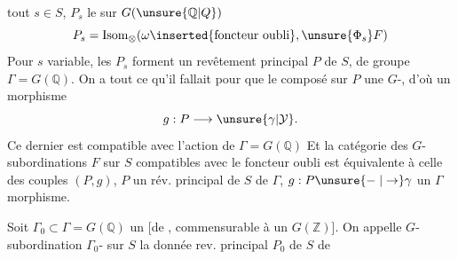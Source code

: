 tout $s\in S$, $P_s$ le  sur $G(\unsure{\mathbb{Q}|Q})$
\[
 P_s=\operatorname{Isom}_{\otimes}(\omega\inserted{\text{foncteur oubli}},\unsure{\Phi_s}F)
\]
Pour $s$ variable, les $P_s$ forment un revêtement principal  $P$ de $S$, de groupe $\Gamma=G(\mathbb{Q})$. On a tout ce qu'il fallait pour que le \unsure{$\otimes$} composé
  sur $P$ une $G$-, d'où un morphisme
\[
 g:P\longrightarrow\unsure{\gamma|\mathcal{Y}}.
\]
 Ce dernier est compatible avec l'action de $\Gamma=G(\mathbb{Q})$  Et la catégorie des  $G$-subordinations $F$ sur $S$ compatibles avec le foncteur oubli est équivalente à celle des couples $(P,g)$, $P$ un rév. principal de $S$ de  $\Gamma$, $g:P\unsure{\relbar|\to}\gamma$ un $\Gamma$ morphisme.

Soit $\Gamma_0\subset\Gamma=G(\mathbb{Q})$ un  [de , commensurable à un $G(\mathbb{Z})$]. On appelle $G$-subordination $\Gamma_0$- sur $S$ la donnée  rev. principal $P_0$ de $S$ de
